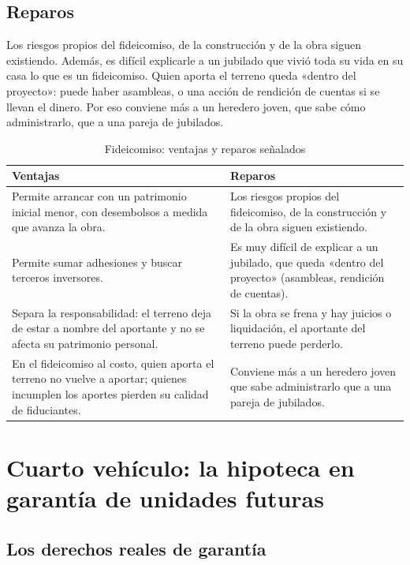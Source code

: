 \documentclass[12pt,oneside]{book}
\begin{document}
\subsection{Reparos}

Los riesgos propios del fideicomiso, de la construcción y de la obra siguen existiendo. Además, es difícil explicarle a un jubilado que vivió toda su vida en su casa lo que es un fideicomiso. Quien aporta el terreno queda «dentro del proyecto»: puede haber asambleas, o una acción de rendición de cuentas si se llevan el dinero. Por eso conviene más a un heredero joven, que sabe cómo administrarlo, que a una pareja de jubilados.

\begin{table}[H]
\centering
\small
\begin{tabularx}{\textwidth}{YY}
\toprule
\textbf{Ventajas} & \textbf{Reparos} \\
\midrule
Permite arrancar con un patrimonio inicial menor, con desembolsos a medida que avanza la obra. & Los riesgos propios del fideicomiso, de la construcción y de la obra siguen existiendo. \\
Permite sumar adhesiones y buscar terceros inversores. & Es muy difícil de explicar a un jubilado, que queda «dentro del proyecto» (asambleas, rendición de cuentas). \\
Separa la responsabilidad: el terreno deja de estar a nombre del aportante y no se afecta su patrimonio personal. & Si la obra se frena y hay juicios o liquidación, el aportante del terreno puede perderlo. \\
En el fideicomiso al costo, quien aporta el terreno no vuelve a aportar; quienes incumplen los aportes pierden su calidad de fiduciantes. & Conviene más a un heredero joven que sabe administrarlo que a una pareja de jubilados. \\
\bottomrule
\end{tabularx}
\caption{Fideicomiso: ventajas y reparos señalados}
\end{table}

\section{Cuarto vehículo: la hipoteca en garantía de unidades futuras}

\subsection{Los derechos reales de garantía}
\end{document}
